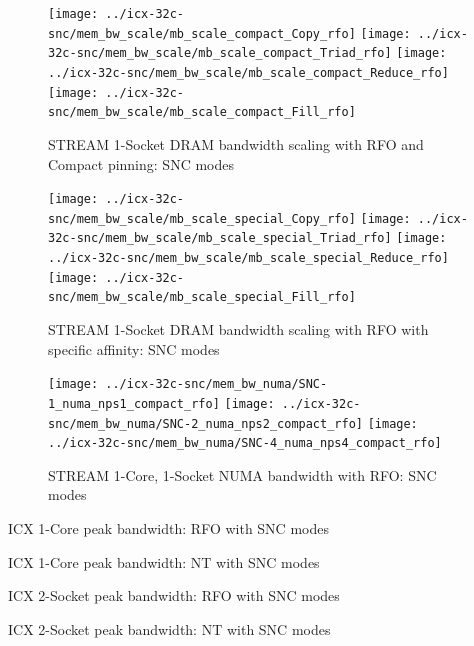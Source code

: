 \documentclass{article}
\begin{document}
\begin{figure}[!hb]
    \centering
    \texttt{[image: ../icx-32c-snc/mem\_bw\_scale/mb\_scale\_compact\_Copy\_rfo]}
    \texttt{[image: ../icx-32c-snc/mem\_bw\_scale/mb\_scale\_compact\_Triad\_rfo]}
    \texttt{[image: ../icx-32c-snc/mem\_bw\_scale/mb\_scale\_compact\_Reduce\_rfo]}
    \texttt{[image: ../icx-32c-snc/mem\_bw\_scale/mb\_scale\_compact\_Fill\_rfo]}
    \caption{STREAM 1-Socket DRAM bandwidth scaling with RFO and Compact pinning: SNC modes}
    \label{figure:mem_bw_scale_compact_rfo_icx_snc}
\end{figure}

\begin{figure}[!hb]
    \centering
    \texttt{[image: ../icx-32c-snc/mem\_bw\_scale/mb\_scale\_special\_Copy\_rfo]}
    \texttt{[image: ../icx-32c-snc/mem\_bw\_scale/mb\_scale\_special\_Triad\_rfo]}
    \texttt{[image: ../icx-32c-snc/mem\_bw\_scale/mb\_scale\_special\_Reduce\_rfo]}
    \texttt{[image: ../icx-32c-snc/mem\_bw\_scale/mb\_scale\_special\_Fill\_rfo]}
    \caption{STREAM 1-Socket DRAM bandwidth scaling with RFO with specific affinity: SNC modes}
    \label{figure:mem_bw_scale_special_rfo_icx_snc}
\end{figure}

\begin{figure}[!hb]
    \centering
    \texttt{[image: ../icx-32c-snc/mem\_bw\_numa/SNC-1\_numa\_nps1\_compact\_rfo]}
    \texttt{[image: ../icx-32c-snc/mem\_bw\_numa/SNC-2\_numa\_nps2\_compact\_rfo]}
    \texttt{[image: ../icx-32c-snc/mem\_bw\_numa/SNC-4\_numa\_nps4\_compact\_rfo]}
    \caption{STREAM 1-Core, 1-Socket NUMA bandwidth with RFO: SNC modes}
    \label{figure:mem_bw_numa_rfo_icx_snc}
\end{figure}

\begin{table}[!hb]
\centering

\caption{ICX 1-Core peak bandwidth: RFO with SNC modes}
\label{table:mem_bw_core_rfo_icx_snc}
\end{table}
\begin{table}[!hb]
\centering

\caption{ICX 1-Core peak bandwidth: NT with SNC modes}
\label{table:mem_bw_core_nt_icx_snc}
\end{table}
\begin{table}[!hb]
\centering

\caption{ICX 2-Socket peak bandwidth: RFO with SNC modes}
\label{table:mem_bw_node_rfo_icx_snc}
\end{table}
\begin{table}[!hb]
\centering

\caption{ICX 2-Socket peak bandwidth: NT with SNC modes}
\label{table:mem_bw_node_nt_icx_snc}
\end{table}
\end{document}
